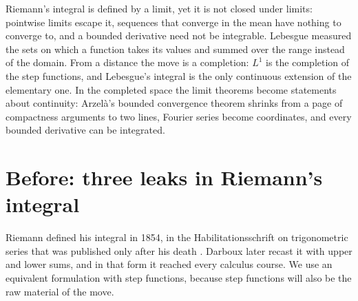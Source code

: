 \begin{refsection}
\newcommand{\lebRiem}{\mathcal{R}}
\newcommand{\lebsymdiff}{\mathbin{\triangle}}

\begin{chaptersummary}
Riemann's integral is defined by a limit, yet it is not closed under limits: pointwise limits escape it, sequences that converge in the mean have nothing to converge to, and a bounded derivative need not be integrable. Lebesgue measured the sets on which a function takes its values and summed over the range instead of the domain. From a distance the move is a completion: $L^1$ is the completion of the step functions, and Lebesgue's integral is the only continuous extension of the elementary one. In the completed space the limit theorems become statements about continuity: Arzelà's bounded convergence theorem shrinks from a page of compactness arguments to two lines, Fourier series become coordinates, and every bounded derivative can be integrated.
\end{chaptersummary}

\section{Before: three leaks in Riemann's integral}\label{sec:lebesgue:before}

Riemann defined his integral in 1854, in the Habilitationsschrift on trigonometric series that was published only after his death \parencite{Riemann1867}. Darboux later recast it with upper and lower sums, and in that form it reached every calculus course. We use an equivalent formulation with step functions, because step functions will also be the raw material of the move.



\end{refsection}
